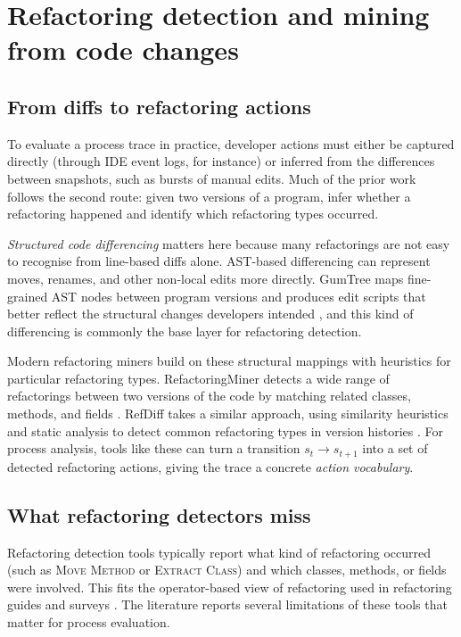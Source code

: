 \section{Refactoring detection and mining from code changes}
\label{sec:refactoring-mining}

\subsection{From diffs to refactoring actions}
To evaluate a process trace in practice, developer actions must either be captured directly (through IDE event logs, for instance) or inferred from the differences between snapshots, such as bursts of manual edits. Much of the prior work follows the second route: given two versions of a program, infer whether a refactoring happened and identify which refactoring types occurred.

\emph{Structured code differencing} matters here because many refactorings are not easy to recognise from line-based diffs alone. AST-based differencing can represent moves, renames, and other non-local edits more directly. GumTree maps fine-grained AST nodes between program versions and produces edit scripts that better reflect the structural changes developers intended \cite{falleri2024gumtree}, and this kind of differencing is commonly the base layer for refactoring detection.

Modern refactoring miners build on these structural mappings with heuristics for particular refactoring types. RefactoringMiner detects a wide range of refactorings between two versions of the code by matching related classes, methods, and fields \cite{alikhanifard2025rminer}. RefDiff takes a similar approach, using similarity heuristics and static analysis to detect common refactoring types in version histories \cite{silva2017refdiff}. For process analysis, tools like these can turn a transition $s_t \rightarrow s_{t+1}$ into a set of detected refactoring actions, giving the trace a concrete \emph{action vocabulary}.

\subsection{What refactoring detectors miss}
Refactoring detection tools typically report what kind of refactoring occurred (such as \textsc{Move Method} or \textsc{Extract Class}) and which classes, methods, or fields were involved. This fits the operator-based view of refactoring used in refactoring guides and surveys \cite{fowler1999refactoring,mens2004survey}. The literature reports several limitations of these tools that matter for process evaluation.

